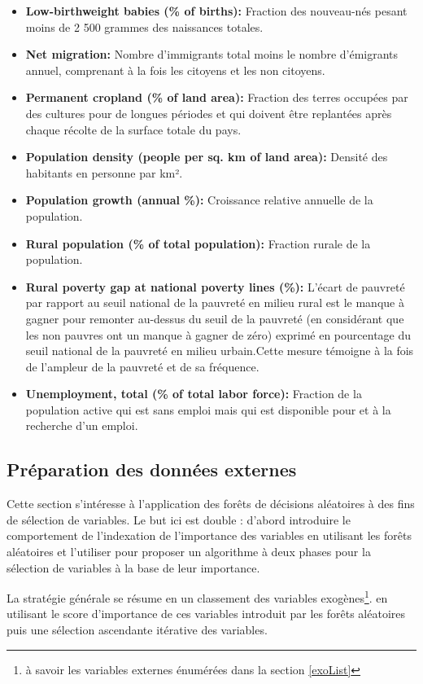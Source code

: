 \begin{itemize}
		\item \textbf{ Low-birthweight babies (\% of births):} Fraction des nouveau-nés pesant moins de 2 500 grammes des naissances totales.
		\item \textbf{ Net migration:} Nombre d'immigrants total moins le nombre d'émigrants annuel, comprenant à la fois les citoyens et les non citoyens.
		\item \textbf{ Permanent cropland (\% of land area):} Fraction des terres occupées par des cultures pour de longues périodes et qui doivent être replantées après chaque récolte de la surface totale du pays.
		\item \textbf{ Population density (people per sq. km of land area):} Densité des habitants en personne par km².
		\item \textbf{ Population growth (annual \%):} Croissance relative annuelle de la population.
		\item \textbf{ Rural population (\% of total population):} Fraction rurale de la population.
		\item \textbf{ Rural poverty gap at national poverty lines (\%):} L'écart de pauvreté par rapport au seuil national de la pauvreté en milieu rural est le manque à gagner pour remonter au-dessus du seuil de la pauvreté (en considérant que les non pauvres ont un manque à gagner de zéro) exprimé en pourcentage du seuil national de la pauvreté en milieu urbain.Cette mesure témoigne à la fois de l'ampleur de la pauvreté et de sa fréquence.
		\item \textbf{ Unemployment, total (\% of total labor force):} Fraction de la population active qui est sans emploi mais qui est disponible pour et à la recherche d'un emploi.
		\end{itemize}

	\subsection{Préparation des données externes}
	Cette section s’intéresse à l'application des forêts de décisions aléatoires à des fins de sélection de variables. Le but ici est double : d'abord introduire le comportement de l'indexation de l'importance des variables en utilisant les forêts aléatoires et l'utiliser pour proposer un algorithme à deux phases pour la sélection de variables à la base de leur importance.\par
	La stratégie générale se résume en un classement des variables exogènes\footnote{à savoir les variables externes énumérées dans la section \ref{exoList}}. en utilisant le score d'importance de ces variables introduit par les forêts aléatoires puis une sélection ascendante itérative des variables.
